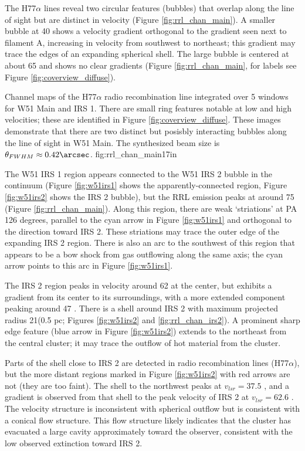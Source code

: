 The H77$\alpha$ lines reveal two circular features (bubbles) that overlap along
the line of sight but are distinct in velocity (Figure
\ref{fig:rrl_chan_main}).  A smaller bubble at 40 \kms shows a velocity
gradient orthogonal to the gradient seen next to filament A, increasing in
velocity from southwest to northeast; this gradient may trace the edges of an
expanding spherical shell.  The large bubble is centered at about 65 \kms and
shows no clear gradients (Figure \ref{fig:rrl_chan_main}, for
labels see Figure \ref{fig:coverview_diffuse}).

{Channel maps of the H77$\alpha$ radio recombination line integrated over 5 \kms windows
for W51 Main and IRS 1.  There are small ring features notable at low and high
velocities; these are identified in Figure \ref{fig:coverview_diffuse}.  These
images demonstrate that there are two distinct but posisbly interacting bubbles
along the line of sight in W51 Main.
The synthesized beam size is $\theta_{FWHM}\approx0.42\arcsec$.
}
{fig:rrl_chan_main}{1}{7in}

The W51 IRS 1 \hii region appears connected to the W51 IRS 2
bubble in the continuum (Figure \ref{fig:w51irs1} shows the
apparently-connected region, Figure \ref{fig:w51irs2} shows the IRS 2 bubble),
but the RRL emission peaks at around 75 \kms (Figure \ref{fig:rrl_chan_main}).
Along this
region, there are weak `striations' at PA 126 degrees, parallel to the cyan
arrow in Figure \ref{fig:w51irs1} and orthogonal to the direction toward
IRS 2.  These striations  may trace the outer edge of the expanding IRS 2
region.  There is also an arc to the southwest of this region that appears to
be a bow shock from gas outflowing along the same axis; the cyan arrow points
to this arc in Figure \ref{fig:w51irs1}.

The IRS 2 region peaks in velocity around 62 \kms at the center, but exhibits a
gradient from its center to its surroundings, with a more extended component
peaking around 47 \kms.  There is a shell around IRS 2 with maximum projected
radius 21\arcsec (0.5 pc; Figures \ref{fig:w51irs2} and
\ref{fig:rrl_chan_irs2}).  A prominent sharp edge feature (blue arrow in Figure
\ref{fig:w51irs2}) extends to the northeast from the central cluster; it may
trace the outflow of hot material from the cluster.

Parts of the shell close to IRS 2 are detected in radio recombination lines
(H77$\alpha$), but the more distant regions marked in Figure \ref{fig:w51irs2}
with red arrows are not (they are too faint).  The shell to the northwest peaks
at $v_{lsr}=37.5$ \kms, and a gradient is observed from that shell to the peak
velocity of IRS 2 at $v_{lsr} = 62.6$ \kms.  The velocity structure is
inconsistent with spherical outflow but is consistent with a conical flow
structure.  This flow structure likely
indicates that the cluster has evacuated a large cavity approximately toward
the observer, consistent with the low observed extinction toward
IRS 2.  


